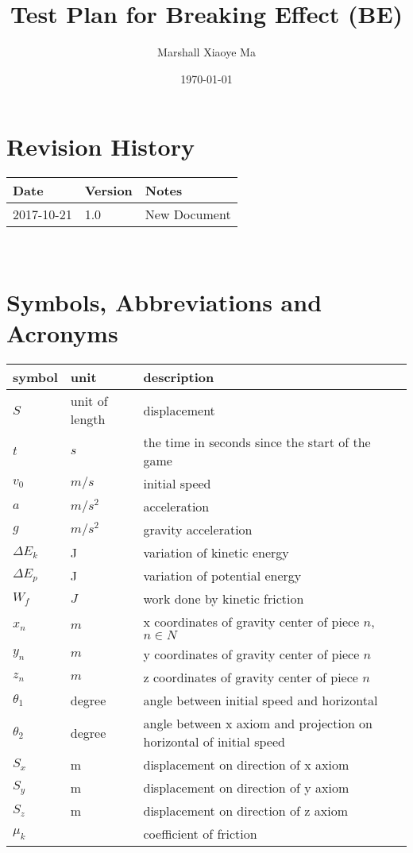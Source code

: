 \documentclass[12pt, titlepage]{article}
\begin{document}
\title{Test Plan for Breaking Effect (BE)} 
\author{Marshall Xiaoye Ma}
\date{\today}
	
\maketitle


\section{Revision History}

\begin{tabularx}{\textwidth}{p{3cm}p{2cm}X}
\toprule {\bf Date} & {\bf Version} & {\bf Notes}\\
\midrule
2017-10-21 & 1.0 & New Document\\
\bottomrule
\end{tabularx}

~\newpage

\section{Symbols, Abbreviations and Acronyms}

	\renewcommand{\arraystretch}{1.2}
	\noindent \begin{tabular}{l l l} 
		\toprule		
		\textbf{symbol} & \textbf{unit} & \textbf{description}\\
		\midrule 
		$S$ & unit of length & displacement
		\\
		$t$ & $s$ & the time in seconds since the start of the game
		\\  
		$v_{0}$ & $m/s$ & initial speed
		\\ 
		$a$ & $m/s^2$ & acceleration
		\\
		$g$ & $m/s^2$ & gravity acceleration
		\\
		$\Delta E_{k}$ & J & variation of kinetic energy
		\\
		$\Delta E_{p}$ & J & variation of potential energy
		\\
		$W_{f}$ & $J$ & work done by kinetic friction
		\\
		$x_{n}$ & $m$ & x coordinates of gravity center of piece $n$, $n \in N$
		\\
		$y_{n}$ & $m$ & y coordinates of gravity center of piece $n$
		\\
		$z_{n}$ & $m$ & z coordinates of gravity center of piece $n$
		\\
		$\theta_{1}$ & degree & angle between initial speed and horizontal
		\\
		$\theta_{2}$ & degree & angle between
		x axiom and projection on horizontal of initial speed
		\\
		$S_{x}$ & m & displacement on direction of x axiom
		\\
		$S_{y}$ & m & displacement on direction of y axiom
		\\
		$S_{z}$ & m & displacement on direction of z axiom
		\\
		$\mu_k$ &  & coefficient of friction
		\\
		\bottomrule
	\end{tabular}
\end{document}
